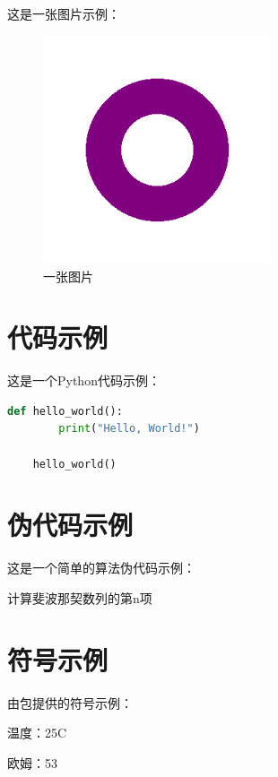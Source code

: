 \documentclass{ranarticle}
\begin{document}
这是一张图片示例：

\begin{figure}[htbp]
    \centering
    \includegraphics[width=0.6\textwidth]{assets/example.png}
    \caption{一张图片}
\end{figure}

\section{代码示例}

这是一个Python代码示例：

\begin{lstlisting}[language=Python]
    def hello_world():
        print("Hello, World!")

    hello_world()
\end{lstlisting}

\section{伪代码示例}

这是一个简单的算法伪代码示例：

\begin{algorithm}[H]
    \caption{计算斐波那契数列的第n项}
\end{algorithm}

\section{符号示例}

由包提供的符号示例：

温度：25\degree C

欧姆：53 \ohm
\end{document}

